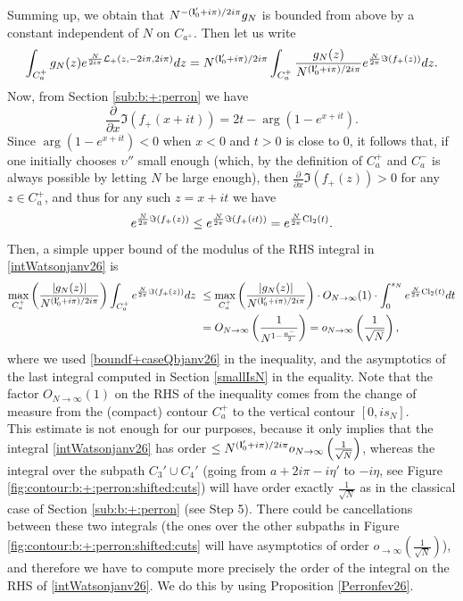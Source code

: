 \documentclass[11pt]{amsart}
\begin{document}
{Summing up, we obtain that $N^{-({\bf l}_0'+i\pi)/2i\pi}g_N$ is bounded from above by a constant independent of $N$ on $C_{a^+}$. Then let us write
\begin{equation}\label{intWatsonjanv26}\int_{C_a^+} g_N(z) e^{\frac{N}{2i\pi}\mathcal{L}_+(z,-2i\pi,2i\pi)}dz =  N^{({\bf l}_0'+i\pi)/2i\pi} \int_{C_a^+} \frac{g_N(z)}{N^{({\bf l}_0'+i\pi)/2i\pi}} e^{\frac{N}{2\pi}\Im(f_+(z))}dz.
\end{equation}
Now, from Section \ref{sub:b:+:perron} we have
$$\dfrac{\partial}{\partial x} \Im (f_+(x+it))  = 2t - \arg\left (1-e^{x+it}\right ).$$
Since $\arg\left (1-e^{x+it}\right )<0$ when $x<0$ and $t>0$ is close to $0$, it follows that, if one initially chooses $\upsilon''$ small enough (which, by the definition of $C_a^+$ and $C_a^-$ is always possible by letting $N$ be large enough), then $\textstyle \frac{\partial}{\partial x} \Im (f_+(z))>0$ for any $z\in C_a^{+}$, and thus for any such $z=x+it$ we have 
\begin{equation}\label{boundf+caseQbjanv26}
e^{\frac{N}{2\pi}\Im(f_+(z))} \leq e^{\frac{N}{2\pi}\Im(f_+(it))}=e^{\frac{N}{2\pi}{\rm Cl}_2(t)}.
\end{equation}
Then, a simple upper bound of the modulus of the RHS integral in \eqref{intWatsonjanv26} is
\begin{align}
\max_{C_a^+}\left(\frac{|g_N(z)|}{N^{({\bf l}_0'+i\pi)/2i\pi}}\right) \int_{C_a^+} e^{\frac{N}{2\pi}\Im(f_+(z))}dz\ & \leq  \max_{C_a^+}\left(\frac{|g_N(z)|}{N^{({\bf l}_0'+i\pi)/2i\pi}}\right) \cdot  O_{N\to\infty}(1) \cdot \int_{0}^{s_N} e^{\frac{N}{2\pi}{\rm Cl}_2(t)}dt \notag \\ &= O_{N\to\infty}\left (\frac{1}{N^{1-\frac{\alpha^-}{2}}}\right )=  o_{N\to\infty}\left (\frac{1}{\sqrt{N}}\right ),\label{domCa+1fev26}
\end{align}
where we used \eqref{boundf+caseQbjanv26} in the inequality, and the asymptotics of the last integral computed in Section \ref{smallIsN} in the equality. Note that the factor $O_{N\to\infty}(1)$ on the RHS of the inequality comes from the change of measure from the (compact) contour $C^{+}_a$ to the vertical contour $[0,i s_N]$.\\
This estimate is not enough for our purposes, because it only implies that the integral \eqref{intWatsonjanv26} has order $\leq \textstyle N^{({\bf l}_0'+i\pi)/2i\pi}o_{N\to\infty}\left (\frac{1}{\sqrt{N}}\right )$, whereas the integral over the subpath $C_3'\cup C_4'$ (going from $a+2i\pi-i\eta'$ to $-i\eta$, see Figure \ref{fig:contour:b:+:perron:shifted:cuts}) will have order exactly $\textstyle \frac{1}{\sqrt{N}}$ as in the classical case of Section \ref{sub:b:+:perron} (see Step 5). There could be cancellations between these two integrals (the ones over the other subpaths in Figure \ref{fig:contour:b:+:perron:shifted:cuts} will have asymptotics of order $\textstyle o_{\to \infty}(\frac{1}{\sqrt{N}})$), and therefore we have to compute more precisely the order of the integral on the RHS of \eqref{intWatsonjanv26}. We do this by using Proposition \ref{Perronfev26}.\\ %
}
\end{document}
